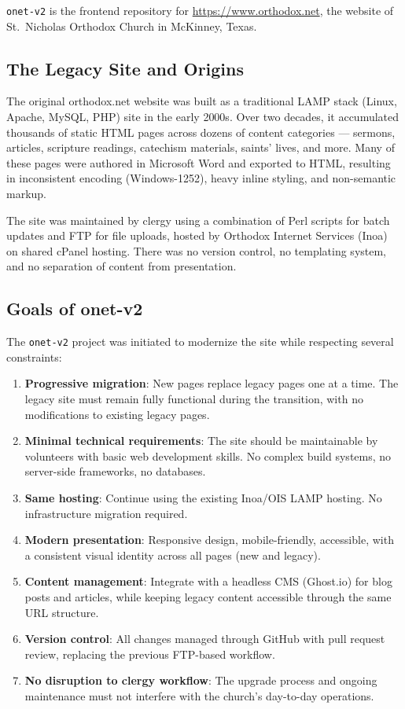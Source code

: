 \documentclass[12pt]{article}
\begin{document}
\texttt{onet-v2} is the frontend repository for \url{https://www.orthodox.net}, the website of St.\ Nicholas Orthodox Church in McKinney, Texas.

\subsection{The Legacy Site and Origins}

The original orthodox.net website was built as a traditional LAMP stack (Linux, Apache, MySQL, PHP) site in the early 2000s. Over two decades, it accumulated thousands of static HTML pages across dozens of content categories --- sermons, articles, scripture readings, catechism materials, saints' lives, and more. Many of these pages were authored in Microsoft Word and exported to HTML, resulting in inconsistent encoding (Windows-1252), heavy inline styling, and non-semantic markup.

The site was maintained by clergy using a combination of Perl scripts for batch updates and FTP for file uploads, hosted by Orthodox Internet Services (Inoa) on shared cPanel hosting. There was no version control, no templating system, and no separation of content from presentation.

\subsection{Goals of onet-v2}

The \texttt{onet-v2} project was initiated to modernize the site while respecting several constraints:

\begin{enumerate}
    \item \textbf{Progressive migration}: New pages replace legacy pages one at a time. The legacy site must remain fully functional during the transition, with no modifications to existing legacy pages.
    \item \textbf{Minimal technical requirements}: The site should be maintainable by volunteers with basic web development skills. No complex build systems, no server-side frameworks, no databases.
    \item \textbf{Same hosting}: Continue using the existing Inoa/OIS LAMP hosting. No infrastructure migration required.
    \item \textbf{Modern presentation}: Responsive design, mobile-friendly, accessible, with a consistent visual identity across all pages (new and legacy).
    \item \textbf{Content management}: Integrate with a headless CMS (Ghost.io) for blog posts and articles, while keeping legacy content accessible through the same URL structure.
    \item \textbf{Version control}: All changes managed through GitHub with pull request review, replacing the previous FTP-based workflow.
    \item \textbf{No disruption to clergy workflow}: The upgrade process and ongoing maintenance must not interfere with the church's day-to-day operations.
\end{enumerate}
\end{document}
